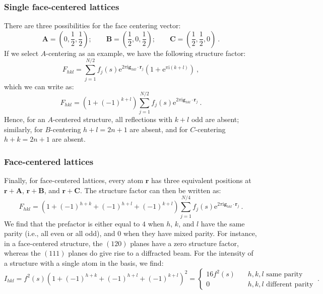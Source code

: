 \subsubsection{Single face-centered lattices}
There are three possibilities for the face centering vector: 
\[
	\mathbf{A} = \left(0,\frac{1}{2},\frac{1}{2}\right);\qquad\mathbf{B} = \left(\frac{1}{2},0,\frac{1}{2}\right);\qquad\mathbf{C} = \left(\frac{1}{2},\frac{1}{2},0\right)\ .
\]
If we select $A$-centering as an example, we have the following structure factor:
\[
	F_{hkl} = \sum_{j=1}^{N/2} f_j(s) \mathrm{e}^{2\pi\mathrm{i}\mathbf{g}_{hkl}\cdot\mathbf{r}_j}\left(1+ \mathrm{e}^{\pi\mathrm{i}(k+l)}\right)\ ,
\]
which we can write as:
\begin{equation}
	F_{hkl} = \left(1+(-1)^{k+l}\right) \sum_{j=1}^{N/2} f_j(s) \mathrm{e}^{2\pi\mathrm{i}\mathbf{g}_{hkl}\cdot\mathbf{r}_j}\ .\label{\chabbr:eq:SFAcentered}
\end{equation}
Hence, for an $A$-centered structure, all reflections with $k+l$ odd are absent; similarly, for $B$-centering $h+l=2n+1$ are absent, and for $C$-centering $h+k=2n+1$ are absent.

\subsubsection{Face-centered lattices}
Finally, for face-centered lattices, every atom $\mathbf{r}$ has three equivalent positions at $\mathbf{r}+\mathbf{A}$, $\mathbf{r}+\mathbf{B}$, and $\mathbf{r}+\mathbf{C}$.  The structure factor can then be written as:
\begin{equation}
	F_{hkl} = \left(1+(-1)^{h+k}+(-1)^{h+l}+(-1)^{k+l}\right) \sum_{j=1}^{N/4} f_j(s) \mathrm{e}^{2\pi\mathrm{i}\mathbf{g}_{hkl}\cdot\mathbf{r}_j}\ .\label{\chabbr:eq:SFFcentered}
\end{equation}
We find that the prefactor is either equal to $4$ when $h$, $k$, and $l$ have the same parity (i.e., all even or all odd), and $0$ when they have mixed parity. For instance, in a face-centered structure, the $(120)$ planes have a zero structure factor, whereas the $(111)$ planes do give rise to a diffracted beam. For the intensity of a structure with a single atom in the basis, we find:
\[
	I_{hkl} = f^2(s) \left(1+(-1)^{h+k}+(-1)^{h+l}+(-1)^{k+l}\right)^2 = \left\{\begin{array}{lcl} 16f^2(s) &\, & h,k,l \text{ same parity}\\ 0 & & h,k,l\text{ different parity}\end{array}\right.\ .
\]

